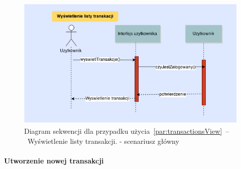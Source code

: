 \begin{figure}[H]
    \includegraphics[width=\textwidth,
    height=0.5\textheight]{images/wyswietl_transakcje.png}
    \caption{Diagram sekwencji dla przypadku użycia~\ref{par:transactionsView}~--~Wyświetlenie listy transakcji.
    - scenariusz główny}
\end{figure}

\paragraph{Utworzenie nowej transakcji\newline}
\label{par:transactionCreate}
